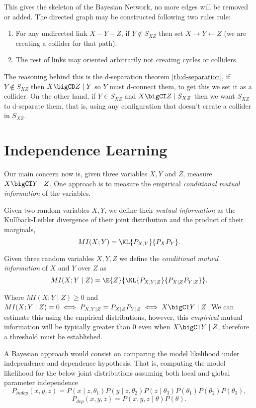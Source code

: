 This gives the skeleton of the Bayesian Network, no more edges will be removed or added. The directed graph may be constructed following two rules rule:
\begin{enumerate}
  \item For any undirected link \(X - Y - Z\), if \(Y \notin S_{XZ}\) then set
    \(X \to Y \leftarrow Z\) (we are creating a collider for that path).
  \item The rest of links may oriented arbitrarily not
creating cycles or colliders.
\end{enumerate}
The reasoning behind this is the
d-separation theorem \ref{th:d-separation},  if \(Y \notin S_{XZ}\) then \(X \bigCD Z \mid Y\) so \(Y\) must d-connect them, to get this we set it as a collider. On the other hand, if \(Y \in S_{XZ}\) and
\(X \bigCI Z \mid S_{XZ}\) then we want \(S_{XZ}\) to d-separate them, that is,
using any configuration that doesn't create a collider in \(S_{XZ}\).

\section{Independence Learning}

Our main concern now is, given three variables \(X, Y\) and \( Z \),  measure \(X \bigCI Y \mid Z\). One approach is to measure the empirical \emph{conditional mutual information} of the variables.

\begin{definition}
  Given two random variables \(X, Y\), we define their \emph{mutual information} as the Kullback-Leibler divergence of their joint distribution and the product of their marginals,
  \[
    MI(X;Y) = \KL{P_{X,Y}}{P_{X}P_{Y}}.
  \]
\end{definition}

\begin{definition}
  Given three random variables \(X, Y, Z\) we define the \emph{conditional mutual information} of \(X\) and \(Y\) over \(Z\) as
  \[
    MI(X;Y\mid Z) = \E{Z}{\KL{P_{X,Y \mid Z}}{P_{X\mid Z} P_{Y \mid Z}}}.
  \]
\end{definition}
Where \(MI(X;Y \mid Z) \geq 0\) and \(MI(X;Y \mid Z) = 0 \iff P_{X,Y \mid Z} = P_{X\mid Z} P_{Y \mid Z} \iff X\bigCI Y \mid Z\). We can estimate this using the empirical distributions, however, this \emph{empirical} mutual information will be typically greater than \(0\) even when \(X\bigCI Y \mid Z\), therefore a threshold must be established.

A Bayesian approach would consist on comparing the model likelihood under independence and dependence hypothesis. That is, computing the model likelihood for the below joint distributions assuming both local and global parameter independence
\[
  P_{indep}(x,y,z) = P(x\mid z, \theta_{1})P(y \mid z, \theta_{2})P(z \mid \theta_{3})P(\theta_{1})P(\theta_{2})P(\theta_{3}),
\]
\[
P_{dep}(x,y,z) = P(x,y,z \mid \theta)P(\theta).
\]
